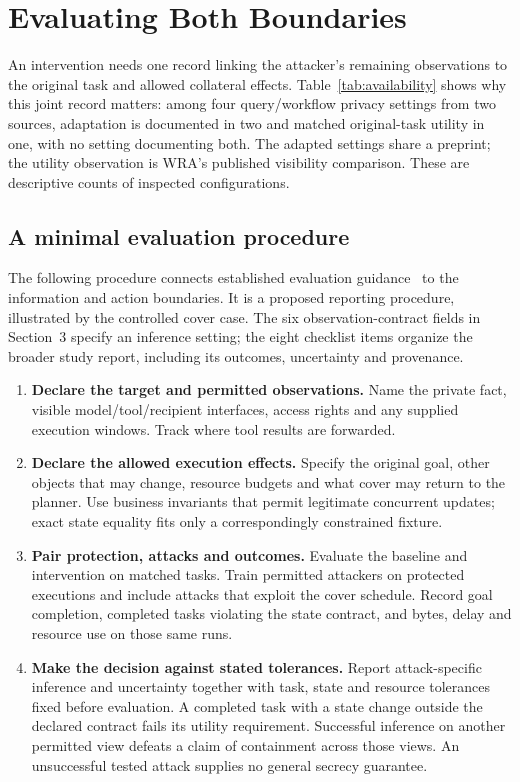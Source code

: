 \section{Evaluating Both Boundaries}\label{sec:reporting}
An intervention needs one record linking the attacker's remaining observations to the original task and allowed collateral effects. Table~\ref{tab:availability} shows why this joint record matters: among four query/workflow privacy settings from two sources, adaptation is documented in two and matched original-task utility in one, with no setting documenting both. The adapted settings share a preprint; the utility observation is WRA's published visibility comparison. These are descriptive counts of inspected configurations.




\subsection{A minimal evaluation procedure}
The following procedure connects established evaluation guidance~\cite{arp2022dos,juarez2014critical,mathews2023critical} to the information and action boundaries. It is a proposed reporting procedure, illustrated by the controlled cover case. The six observation-contract fields in Section~3 specify an inference setting; the eight checklist items organize the broader study report, including its outcomes, uncertainty and provenance.

\begin{enumerate}
\item \textbf{Declare the target and permitted observations.} Name the private fact, visible model/tool/recipient interfaces, access rights and any supplied execution windows. Track where tool results are forwarded.
\item \textbf{Declare the allowed execution effects.} Specify the original goal, other objects that may change, resource budgets and what cover may return to the planner. Use business invariants that permit legitimate concurrent updates; exact state equality fits only a correspondingly constrained fixture.
\item \textbf{Pair protection, attacks and outcomes.} Evaluate the baseline and intervention on matched tasks. Train permitted attackers on protected executions and include attacks that exploit the cover schedule. Record goal completion, completed tasks violating the state contract, and bytes, delay and resource use on those same runs.
\item \textbf{Make the decision against stated tolerances.} Report attack-specific inference and uncertainty together with task, state and resource tolerances fixed before evaluation. A completed task with a state change outside the declared contract fails its utility requirement. Successful inference on another permitted view defeats a claim of containment across those views. An unsuccessful tested attack supplies no general secrecy guarantee.
\end{enumerate}

